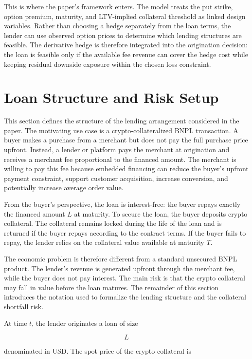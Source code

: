 \documentclass[11pt]{article}
\begin{document}
This is where the paper’s framework enters. The model treats the put strike, option premium, maturity, and LTV-implied collateral threshold as linked design variables. Rather than choosing a hedge separately from the loan terms, the lender can use observed option prices to determine which lending structures are feasible. The derivative hedge is therefore integrated into the origination decision: the loan is feasible only if the available fee revenue can cover the hedge cost while keeping residual downside exposure within the chosen loss constraint.


\section{Loan Structure and Risk Setup}

This section defines the structure of the lending arrangement considered in the paper. The motivating use case is a crypto-collateralized BNPL transaction. A buyer makes a purchase from a merchant but does not pay the full purchase price upfront. Instead, a lender or platform pays the merchant at origination and receives a merchant fee proportional to the financed amount. The merchant is willing to pay this fee because embedded financing can reduce the buyer’s upfront payment constraint, support customer acquisition, increase conversion, and potentially increase average order value.

From the buyer’s perspective, the loan is interest-free: the buyer repays exactly the financed amount $L$ at maturity. To secure the loan, the buyer deposits crypto collateral. The collateral remains locked during the life of the loan and is returned if the buyer repays according to the contract terms. If the buyer fails to repay, the lender relies on the collateral value available at maturity $T$.

The economic problem is therefore different from a standard unsecured BNPL product. The lender’s revenue is generated upfront through the merchant fee, while the buyer does not pay interest. The main risk is that the crypto collateral may fall in value before the loan matures. The remainder of this section introduces the notation used to formalize the lending structure and the collateral shortfall risk.

At time $t$, the lender originates a loan of size

$$
L
$$

denominated in USD. The spot price of the crypto collateral is
\end{document}
